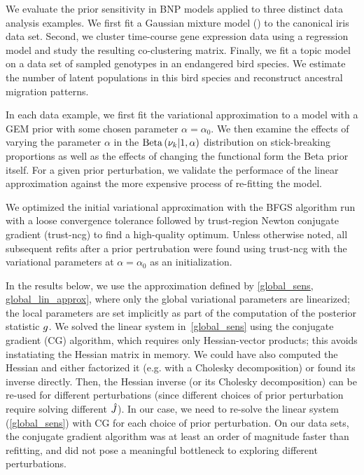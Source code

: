 We evaluate the prior sensitivity in BNP models applied to three distinct data analysis examples.
We first fit a Gaussian mixture model () to the canonical iris data set.
Second, we cluster time-course gene expression data using a regression model
and study the resulting co-clustering matrix.
Finally, we fit a topic model
on a data set of sampled genotypes in an endangered bird species.
We estimate the number of latent populations in this
bird species and reconstruct ancestral migration patterns.

In each data example, we first fit the variational approximation to a model
with a GEM prior with some chosen parameter $\alpha = \alpha_0$.
We then examine the effects of varying the parameter $\alpha$
in the $\mathrm{Beta}\left(\nu_{k} \vert 1, \alpha\right)$ distribution on stick-breaking proportions
as well as
the effects of changing the functional form the Beta prior itself.
For a given prior perturbation,
we validate the performace of the linear approximation against
the more expensive process of re-fitting the model.



We optimized the initial variational approximation with
the BFGS algorithm run with a loose convergence tolerance
followed by trust-region Newton conjugate gradient (trust-ncg) to find a high-quality optimum.
Unless otherwise noted, all subsequent refits after a prior pertrubation were found
using trust-ncg with the variational parameters at $\alpha = \alpha_0$ as an initialization.

In the results below, we use
the approximation defined by \eqref{global_sens, global_lin_approx},
where only the global variational parameters are linearized;
the local parameters are set implicitly as part of the
computation of the posterior statistic $g$.
We solved the linear system in~\eqref{global_sens} using
the conjugate gradient (CG) algorithm, which requires only Hessian-vector products;
this avoids instatiating the Hessian matrix in memory.
We could have also computed the Hessian and
either factorized it (e.g. with a Cholesky decomposition) or found its inverse directly.
Then, the Hessian inverse (or its Cholesky decomposition) can
be re-used for different perturbations
(since different choices of prior perturbation
require solving different $\hat J$).
In our case, we need to re-solve the linear system (\eqref{global_sens}) with
CG for each choice of prior perturbation.
On our data sets, the conjugate gradient algorithm was at least
an order of magnitude faster than refitting, and did not pose a meaningful bottleneck
to exploring different perturbations.

